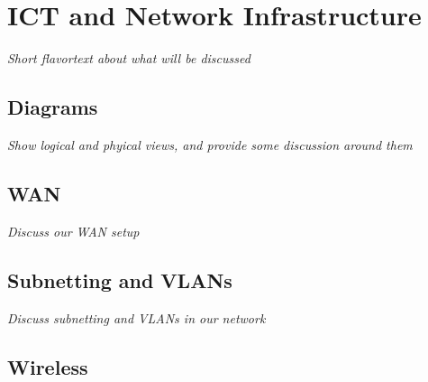 \section{ICT and Network Infrastructure}

%

\textit{Short flavortext about what will be discussed}


\subsection{Diagrams}

\textit{Show logical and phyical views, and provide some discussion around them}

\subsection{WAN}

\textit{Discuss our WAN setup}

\subsection{Subnetting and VLANs}

\textit{Discuss subnetting and VLANs in our network}

\subsection{Wireless}


